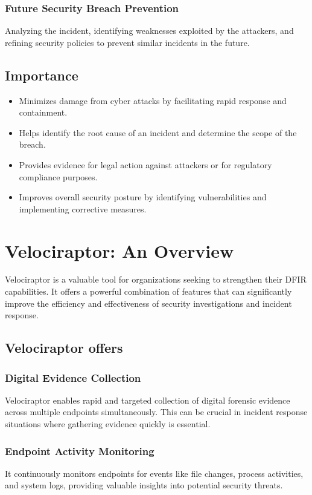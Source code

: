 \documentclass[a4paper, 11pt, oneside]{article} %
\begin{document}
\subsubsection{Future Security Breach Prevention}
Analyzing the incident, identifying weaknesses exploited by the attackers, and refining security policies to prevent similar incidents in the future.

\subsection{Importance}
\begin{itemize}
    \item Minimizes damage from cyber attacks by facilitating rapid response and containment.
    \item Helps identify the root cause of an incident and determine the scope of the breach.
    \item Provides evidence for legal action against attackers or for regulatory compliance purposes.
    \item Improves overall security posture by identifying vulnerabilities and implementing corrective measures.
\end{itemize}

\section{Velociraptor: An Overview}
Velociraptor is a valuable tool for organizations seeking to strengthen their DFIR capabilities.  It offers a powerful combination of features that can significantly improve the efficiency and effectiveness of security investigations and incident response.

\subsection{Velociraptor offers}

\subsubsection{Digital Evidence Collection}
Velociraptor enables rapid and targeted collection of digital forensic evidence across multiple endpoints simultaneously. This can be crucial in incident response situations where gathering evidence quickly is essential.

\subsubsection{Endpoint Activity Monitoring}
It continuously monitors endpoints for events like file changes, process activities, and system logs, providing valuable insights into potential security threats.
\end{document}
